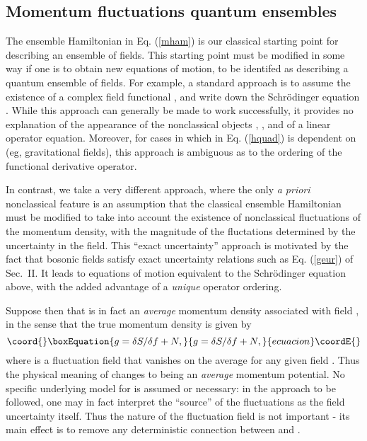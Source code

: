 \documentclass[a4paper,preprint, showpacs, aps, draft]{revtex4}
\begin{document}
{\subsection{Momentum fluctuations \myHighlight{$\Rightarrow$}\coordHE{} quantum ensembles}

The ensemble Hamiltonian \coordHE{} in Eq. (\ref{mham}) is our classical
starting point for describing an ensemble of fields.  This starting
point must be modified in some way if one is to obtain new equations of
motion, to be identifed as describing a quantum 
ensemble of fields.  For example, a standard approach is to assume the
existence of a complex field functional \myHighlight{$\Psi[f,t]$}\coordHE{}, and write down the
Schr\"{o}dinger equation \coordHE{} \cite{schweber}.  While this approach can
generally be made to work successfully, it provides no explanation of
the appearance of the nonclassical objects 
\myHighlight{$\Psi$}\coordHE{}, \myHighlight{$\hbar$}\coordHE{}, and of a linear operator equation.  Moreover,
for cases in which \coordHE{} in Eq. (\ref{hquad}) is dependent on \coordHE{}
(eg, gravitational fields),
this approach is ambiguous as to the ordering of the functional
derivative operator.  

In contrast, we take a very different approach, where the only
{\it a priori} nonclassical feature is an 
assumption that the classical ensemble Hamiltonian \coordHE{} must be
modified to 
take into account the existence of nonclassical fluctuations of the momentum
density, with the magnitude of the fluctations determined by the
uncertainty in the field. This ``exact uncertainty'' approach is
motivated by the fact that bosonic fields satisfy exact uncertainty
relations such as Eq. (\ref{geur}) of Sec.~II. It leads to equations of
motion equivalent to the Schr\"{o}dinger equation above, with the added
advantage of a {\it unique} operator ordering.

Suppose then that \coordHE{} is in fact an {\it average}
momentum density associated with field \coordHE{}, in the sense that the true momentum
density is given by 
\begin{equation}\coord{}\boxEquation{ \label{noise}
g = \delta S/\delta f + N,
}{ g = \delta S/\delta f + N,
}{ecuacion}\coordE{}\end{equation}
where \coordHE{} is a fluctuation field that vanishes on the average for any
given field \coordHE{}. Thus the physical meaning of \coordHE{} changes to being an
{\it average} momentum potential. 
No specific underlying model for \coordHE{} is assumed or necessary: in the approach
to be followed, one may in fact
interpret the ``source'' of the fluctuations as the field
uncertainty itself. Thus the nature of the fluctuation field is not
important -
its main effect is to remove any deterministic connection between \coordHE{}
and \coordHE{}. 

}
\end{document}
